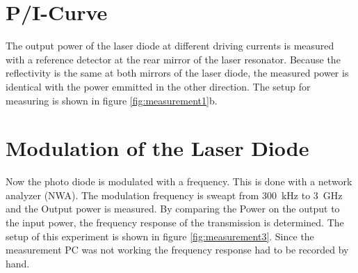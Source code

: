 \section{P/I-Curve}
The output power of the laser diode at different driving currents is measured with a reference detector at the rear mirror of the laser resonator. Because the reflectivity is the same at both mirrors of the laser diode, the measured power is identical with the power emmitted in the other direction. The setup for measuring is shown in figure \ref{fig:measurement1}b.

\section{Modulation of the Laser Diode}

Now the photo diode is modulated with a frequency. This is done with a network analyzer (NWA). The modulation frequency is sweapt from 300~kHz to 3~GHz and the Output power is measured. By comparing the Power on the output to the input power, the frequency response of the transmission is determined. The setup of this experiment is shown in figure \ref{fig:measurement3}. Since the measurement PC was not working the frequency response had to be recorded by hand.

 